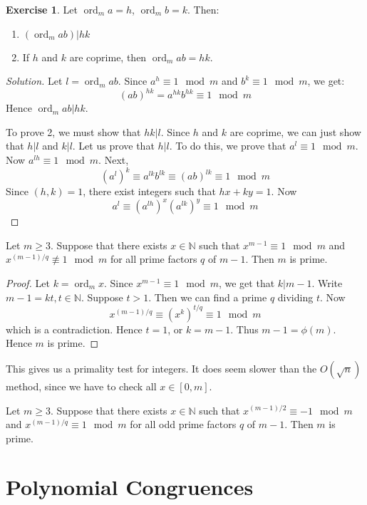 \documentclass[12pt,letterpaper]{book}
\theoremstyle{definition}
\newtheorem*{exercise}{Exercise}
\newenvironment{solution}
  {\renewcommand\qedsymbol{$\blacksquare$}\begin{proof}[Solution]}
  {\end{proof}}
\newcommand{\N}{\mathbb{N}}
\DeclareMathOperator{\ord}{ord}
\begin{document}
\begin{exercise}
  Let $\ord_m a = h$, $\ord_m b = k$. Then:
  \begin{enumerate}
    \item $(\ord_m ab) | hk$
    \item If $h$ and $k$ are coprime, then $\ord_m ab = hk$.
  \end{enumerate}
\end{exercise}
\begin{solution}
  Let $l = \ord_m ab$. Since $a^h \equiv 1 \mod m$ and $b^k \equiv 1 \mod m$, we get:
  \[(ab)^{hk} = a^{hk} b^{hk} \equiv 1 \mod m\]
  Hence $\ord_m ab|hk$.

  To prove 2, we must show that $hk|l$. Since $h$ and $k$ are coprime, we can just show that $h|l$ and $k|l$. Let us prove that $h|l$. To do this, we prove that $a^l \equiv 1 \mod m$. Now $a^{lh} \equiv 1 \mod m$. Next,
  \[(a^l)^k \equiv a^{lk} b^{lk} \equiv (ab)^{lk} \equiv 1 \mod m\]
  Since $(h,k) = 1$, there exist integers such that $hx+ky = 1$. Now 
  \[a^l \equiv (a^{lh})^x (a^{lk})^y \equiv 1 \mod m\]
\end{solution}

\begin{theorem}
  Let $m \geq 3$. Suppose that there exists $x \in \N$ such that $x^{m-1} \equiv 1 \mod m$ and $x^{(m-1)/q} \not \equiv 1 \mod m$ for all prime factors $q$ of $m-1$. Then $m$ is prime.
\end{theorem}
\begin{proof}
  Let $k = \ord_m x$. Since $x^{m-1} \equiv 1 \mod m$, we get that $k|m-1$. Write $m-1 = kt, t \in \N$. Suppose $t > 1$. Then we can find a prime $q$ dividing $t$. Now
  \[x^{(m-1)/q} \equiv (x^k)^{t/q} \equiv 1 \mod m\]
  which is a contradiction. Hence $t = 1$, or $k = m-1$. Thus $m-1 = \phi(m)$. Hence $m$ is prime.
\end{proof}

This gives us a primality test for integers. It does seem slower than the $O(\sqrt n)$ method, since we have to check all $x \in [0,m]$.

\begin{corollary}
  Let $m \geq 3$. Suppose  that there exists $x \in \N$ such that $x^{(m-1)/2} \equiv -1 \mod m$ and $x^{(m-1)/q} \equiv 1 \mod m$ for all odd prime factors $q$ of $m-1$. Then $m$ is prime.
\end{corollary}

\section{Polynomial Congruences}
\end{document}
